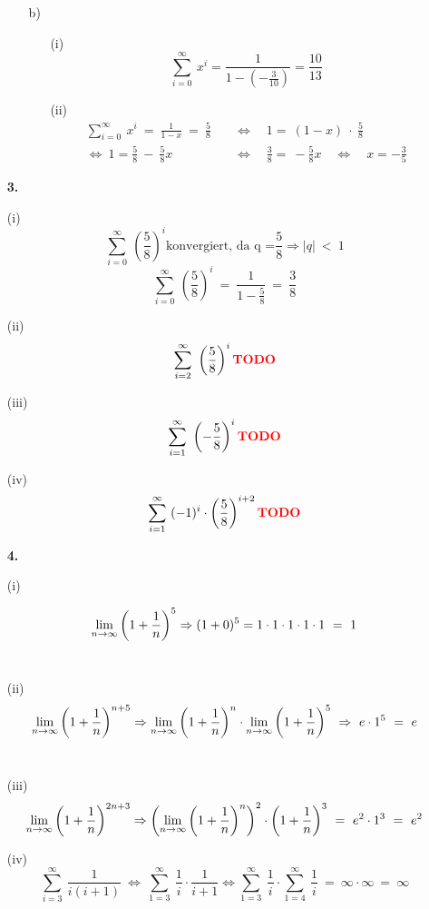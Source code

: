 \documentclass [a4paper,12pt]{article}
\begin{document}
\begin{enumerate}
\begin{enumerate}
\begin{enumerate}
                    \end{enumerate}
                \item[b)]
			\begin{enumerate}
			    \item[(i)]
							 \[ \sum_{i=0}^\infty~x^i = \frac{1}{1-(-\frac{3}{10})} = \frac{10}{13} \]
			    \item[(ii)]
			    	\begin{align*}
						 \sum_{i=0}^\infty~x^i \ = \ \frac{1}{1-x} \ = \ \frac{5}{8} \quad &\Leftrightarrow \quad 1  = \ (1-x) \ \cdot \ \frac{5}{8} \\[0,5cm]
						 \Leftrightarrow   \  1  = \frac{5}{8} \ - \ \frac{5}{8}x \quad &\Leftrightarrow \quad \frac{3}{8}  = \ -\frac{5}{8}x \quad \Leftrightarrow \quad x = -\frac{3}{5}
					\end {align*}	
			\end{enumerate}
            \end{enumerate}
        \item[\textbf{3.}]
        		\item[(i)]
        			$$\sum_{i=0}^\infty~\left(\frac{5}{8} \right)^i \text{konvergiert, da q =} \frac{5}{8} \Rightarrow |q| \ < \ 1$$ 
        			$$\sum_{i=0}^\infty~\left(\frac{5}{8} \right)^i \ = \ \frac{1}{1 -\frac{5}{8}} \ = \ \frac{3}{8} $$
        		\item[(ii)]
        			$$\sum_{i=2}^\infty~\left(\frac{5}{8} \right)^i \textbf{\textcolor{red}{TODO}}$$ 
        		\item[(iii)]
        			$$\sum_{i=1}^\infty~\left(-\frac{5}{8} \right)^i \textbf{\textcolor{red}{TODO}}$$
        		\item[(iv)]
            		$$\sum_{i=1}^\infty~(-1)^i  \cdot  \left( \frac{5}{8} \right)^{i+2} \textbf{\textcolor{red}{TODO}}$$
        \item[\textbf{4.}]
        		\item[(i)]
        			
        			$$\limp \left(1+\frac{1}{n} \right)^5 \Rightarrow (1+0)^5 = 1 \cdot 1 \cdot 1 \cdot 1 \cdot 1 \ = \ 1 $$  \\
        		\item[(ii)]
        			$$\limp \left( 1 + \frac{1}{n} \right)^{n+5} \Rightarrow \limp \left(1+\frac{1}{n} \right)^n \cdot \limp \left(1+\frac{1}{n} \right)^5 \ \Rightarrow \  e \cdot 1^5 \ = \ e  	$$ \\
        		\item[(iii)] 
        		$$ \limp \left( 1 + \frac{1}{n} \right)^{2n+3} \Rightarrow \left(\limp \left( 1 + \frac{1}{n} \right)^n \right)^2 \cdot \left(1+ \frac{1}{n} \right)^3 \ = \ e^2 \cdot 1^3 \ = \ e^2 $$
        		\item[(iv)]    
        		$$ \sum_{i=3}^\infty~\frac{1}{i(i+1)} \ \Leftrightarrow \ \sum_{1=3}^\infty~\frac{1}{i}\cdot\frac{1}{i+1} \Leftrightarrow \sum_{1=3}^\infty~\frac{1}{i} \cdot \sum_{1=4}^\infty~\frac{1}{i} \ = \ \infty \cdot \infty \ = \ \infty $$ 			
            
    \end{enumerate}
\end{document}
